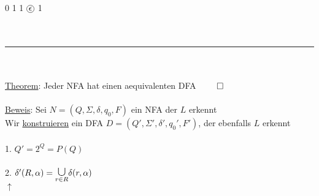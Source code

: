 \documentclass[18pt,a4paper]{scrreprt}
\newcommand*\circled[1]{\tikz[baseline=(char.base)]{
            \node[shape=circle,draw,inner sep=1pt] (char) {#1};}}
\newcommand{\tab}{\hspace*{2em}}
\begin{document}
\tab\tab 0 \tab 1 \tab\: \tab 1 \tab\: \textcolor{red}{$\circled{\textcolor{black}{$\epsilon$}}$} \tab 1 \tab\:\\
\\
\\
\rule{\textwidth}{0.4mm}\\
\\
\uline{Theorem}: Jeder NFA hat einen aequivalenten DFA $\qed$\\
\\
\uline{Beweis}: Sei $N = (Q, \Sigma, \delta, q_0, F)$ ein NFA der $L$ erkennt\\
Wir \uline{konstruieren} ein DFA $D = (Q', \Sigma', \delta', q_0', F')$, der ebenfalls $L$ erkennt\\
\\
1. $Q' = 2^Q = P(Q)$\\
\\
2. $\delta'(R,\alpha) = \underset{r \in R}{\scalebox{1.5}{$\cup$}}{\delta(r,\alpha)}$\\
\tab\: $\uparrow $\\
\tab \scalebox{0.8}{$\in Q'$}\\
\\
\\
\end{document}
